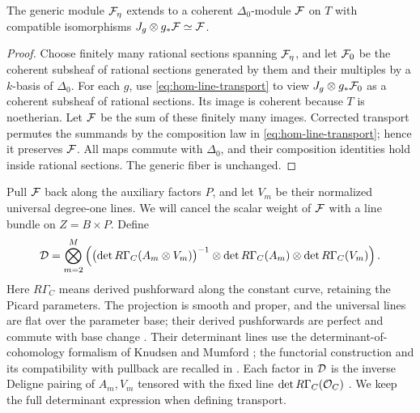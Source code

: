 \begin{lemma}\label{lem:twisted-extension}
The generic module \(\mathcal F_\eta\) extends to a coherent
\(\Delta_0\)-module \(\mathcal F\) on \(T\) with compatible isomorphisms
\(J_g\otimes g_*\mathcal F\simeq\mathcal F\).
\end{lemma}
\begin{proof}
Choose finitely many rational sections spanning \(\mathcal F_\eta\), and
let \(\mathcal F_0\) be the coherent subsheaf of rational sections generated
by them and their multiples by a \(k\)-basis of \(\Delta_0\).
For each \(g\), use \eqref{eq:hom-line-transport} to view
\(J_g\otimes g_*\mathcal F_0\) as a coherent subsheaf of rational sections.
Its image is coherent because \(T\) is noetherian.  Let \(\mathcal F\)
be the sum of these finitely many images.  Corrected transport
permutes the summands by the composition law in
\eqref{eq:hom-line-transport}; hence it preserves \(\mathcal F\).
All maps commute with \(\Delta_0\), and their composition identities
hold inside rational sections.  The generic fiber is unchanged.
\end{proof}

Pull \(\mathcal F\) back along the auxiliary factors \(P\), and let \(V_m\)
be their normalized universal degree-one lines. We will cancel the
scalar weight of \(\mathcal F\) with a line bundle on \(Z=B\times P\).
Define
\begin{equation}\label{eq:determinant-correction}
\mathcal D=\bigotimes_{m=2}^M
\left(
 \bigl(\det R\Gamma_C(A_m\otimes V_m)\bigr)^{-1}
 \otimes\det R\Gamma_C(A_m)
 \otimes\det R\Gamma_C(V_m)
\right).
\end{equation}
Here \(R\Gamma_C\) means derived pushforward along the constant
curve, retaining the Picard parameters. The projection is smooth and
proper, and the universal lines are flat over the parameter base;
their derived pushforwards are perfect and commute with base change
\cite[Tag 07VK]{Stacks}.
Their determinant lines use the determinant-of-cohomology formalism of
Knudsen and Mumford \cite{KnudsenMumford76}; the functorial construction
and its compatibility with pullback are recalled in
\cite[Tags 0FJI and 0FJW]{Stacks}.
Each factor in \(\mathcal D\) is the inverse Deligne pairing of \(A_m,V_m\)
tensored with the fixed line \(\det R\Gamma_C(\mathcal O_C)\)
\cite[Construction~7.2, Equation~(7.2.1)]{Deligne87}.
We keep the full determinant expression when defining transport.

